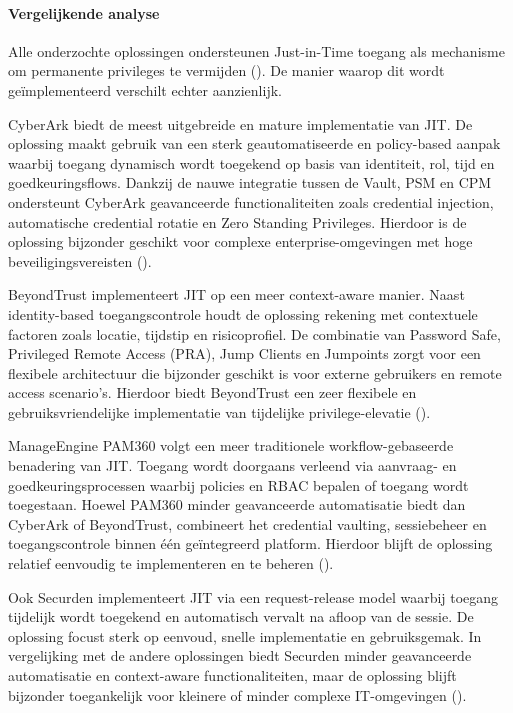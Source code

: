 \paragraph{Vergelijkende analyse}
Alle onderzochte oplossingen ondersteunen Just-in-Time toegang als mechanisme om permanente privileges te vermijden (\cite{nist2020}). De manier waarop dit wordt geïmplementeerd verschilt echter aanzienlijk.

CyberArk biedt de meest uitgebreide en mature implementatie van JIT. De oplossing maakt gebruik van een sterk geautomatiseerde en policy-based aanpak waarbij toegang dynamisch wordt toegekend op basis van identiteit, rol, tijd en goedkeuringsflows. Dankzij de nauwe integratie tussen de Vault, PSM en CPM ondersteunt CyberArk geavanceerde functionaliteiten zoals credential injection, automatische credential rotatie en Zero Standing Privileges. Hierdoor is de oplossing bijzonder geschikt voor complexe enterprise-omgevingen met hoge beveiligingsvereisten (\cite{cyberark_psm,cyberark_pam_architecture}).

BeyondTrust implementeert JIT op een meer context-aware manier. Naast identity-based toegangscontrole houdt de oplossing rekening met contextuele factoren zoals locatie, tijdstip en risicoprofiel. De combinatie van Password Safe, Privileged Remote Access (PRA), Jump Clients en Jumpoints zorgt voor een flexibele architectuur die bijzonder geschikt is voor externe gebruikers en remote access scenario’s. Hierdoor biedt BeyondTrust een zeer flexibele en gebruiksvriendelijke implementatie van tijdelijke privilege-elevatie (\cite{beyondtrust_passwordsafe,beyondtrust_authentication,beyondtrust_jumpclient,beyondtrust_jumpoint}).

ManageEngine PAM360 volgt een meer traditionele workflow-gebaseerde benadering van JIT. Toegang wordt doorgaans verleend via aanvraag- en goedkeuringsprocessen waarbij policies en RBAC bepalen of toegang wordt toegestaan. Hoewel PAM360 minder geavanceerde automatisatie biedt dan CyberArk of BeyondTrust, combineert het credential vaulting, sessiebeheer en toegangscontrole binnen één geïntegreerd platform. Hierdoor blijft de oplossing relatief eenvoudig te implementeren en te beheren (\cite{pam360_architecture}).

Ook Securden implementeert JIT via een request-release model waarbij toegang tijdelijk wordt toegekend en automatisch vervalt na afloop van de sessie. De oplossing focust sterk op eenvoud, snelle implementatie en gebruiksgemak. In vergelijking met de andere oplossingen biedt Securden minder geavanceerde automatisatie en context-aware functionaliteiten, maar de oplossing blijft bijzonder toegankelijk voor kleinere of minder complexe IT-omgevingen (\cite{securden_pam,securden_session_monitoring}).

